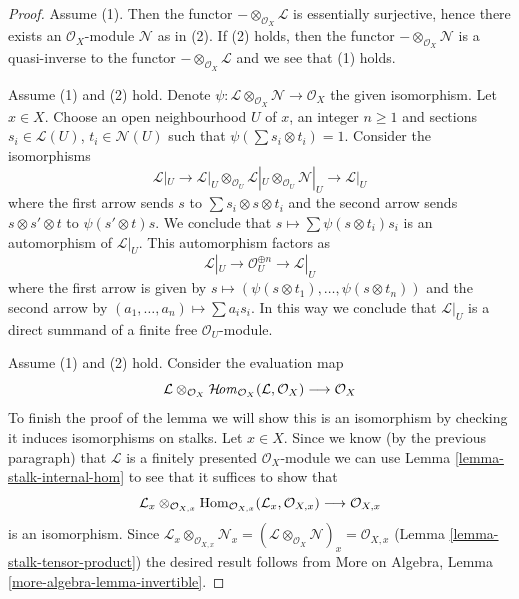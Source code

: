 \begin{proof}
Assume (1). Then the functor $- \otimes_{\mathcal{O}_X} \mathcal{L}$
is essentially surjective, hence there exists an $\mathcal{O}_X$-module
$\mathcal{N}$ as in (2). If (2) holds, then the functor
$- \otimes_{\mathcal{O}_X} \mathcal{N}$ is a quasi-inverse
to the functor $- \otimes_{\mathcal{O}_X} \mathcal{L}$ and
we see that (1) holds.

\medskip\noindent
Assume (1) and (2) hold. Denote
$\psi : \mathcal{L} \otimes_{\mathcal{O}_X} \mathcal{N} \to \mathcal{O}_X$
the given isomorphism. Let $x \in X$. Choose an open neighbourhood
$U$ of $x$, an integer $n \geq 1$ and sections $s_i \in \mathcal{L}(U)$,
$t_i \in \mathcal{N}(U)$ such that $\psi(\sum s_i \otimes t_i) = 1$.
Consider the isomorphisms
$$
\mathcal{L}|_U \to
\mathcal{L}|_U \otimes_{\mathcal{O}_U}
\mathcal{L}|_U \otimes_{\mathcal{O}_U} \mathcal{N}|_U \to \mathcal{L}|_U
$$
where the first arrow sends $s$ to $\sum s_i \otimes s \otimes t_i$
and the second arrow sends $s \otimes s' \otimes t$ to $\psi(s' \otimes t)s$.
We conclude that $s \mapsto \sum \psi(s \otimes t_i)s_i$ is
an automorphism of $\mathcal{L}|_U$. This automorphism factors as
$$
\mathcal{L}|_U \to \mathcal{O}_U^{\oplus n} \to \mathcal{L}|_U
$$
where the first arrow is given by
$s \mapsto (\psi(s \otimes t_1), \ldots, \psi(s \otimes t_n))$
and the second arrow by $(a_1, \ldots, a_n) \mapsto \sum a_i s_i$.
In this way we conclude that $\mathcal{L}|_U$ is a direct summand
of a finite free $\mathcal{O}_U$-module.

\medskip\noindent
Assume (1) and (2) hold. Consider the evaluation map
$$
\mathcal{L} \otimes_{\mathcal{O}_X}
\mathop{\mathcal{H}\!\mathit{om}}\nolimits_{\mathcal{O}_X}(\mathcal{L}, \mathcal{O}_X)
\longrightarrow \mathcal{O}_X
$$
To finish the proof of the lemma
we will show this is an isomorphism by checking it induces
isomorphisms on stalks. Let $x \in X$.
Since we know (by the previous paragraph)
that $\mathcal{L}$ is a finitely presented
$\mathcal{O}_X$-module
we can use Lemma \ref{lemma-stalk-internal-hom}
to see that it suffices to show that
$$
\mathcal{L}_x \otimes_{\mathcal{O}_{X, x}}
\mathop{\mathrm{Hom}}\nolimits_{\mathcal{O}_{X, x}}(\mathcal{L}_x, \mathcal{O}_{X, x})
\longrightarrow \mathcal{O}_{X, x}
$$
is an isomorphism. Since
$\mathcal{L}_x \otimes_{\mathcal{O}_{X, x}} \mathcal{N}_x =
(\mathcal{L} \otimes_{\mathcal{O}_X} \mathcal{N})_x =
\mathcal{O}_{X, x}$ (Lemma \ref{lemma-stalk-tensor-product})
the desired result follows from
More on Algebra, Lemma \ref{more-algebra-lemma-invertible}.
\end{proof}

